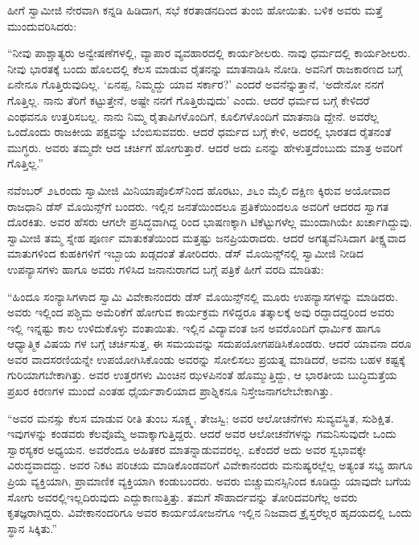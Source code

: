ಹೀಗೆ ಸ್ವಾಮೀಜಿ ನೇರವಾಗಿ ಕನ್ನಡಿ ಹಿಡಿದಾಗ, ಸಭೆ ಕರತಾಡನದಿಂದ ತುಂಬಿ ಹೋಯಿತು. ಬಳಿಕ ಅವರು ಮತ್ತೆ ಮುಂದುವರಿಸಿದರು:

“ನೀವು ಪಾಶ್ಚಾತ್ಯರು ಅನ್ವೇಷಣೆಗಳಲ್ಲಿ, ವ್ಯಾಪಾರ ವ್ಯವಹಾರದಲ್ಲಿ ಕಾರ್ಯಶೀಲರು. ನಾವು ಧರ್ಮದಲ್ಲಿ ಕಾರ್ಯಶೀಲರು. ನೀವು ಭಾರತಕ್ಕೆ ಬಂದು ಹೊಲದಲ್ಲಿ ಕೆಲಸ ಮಾಡುವ ರೈತನನ್ನು ಮಾತನಾಡಿಸಿ ನೋಡಿ. ಅವನಿಗೆ ರಾಜಕಾರಣದ ಬಗ್ಗೆ ಏನೇನೂ ಗೊತ್ತಿರುವುದಿಲ್ಲ. ‘ಏನಪ್ಪ, ನಿಮ್ಮದ್ದು ಯಾವ ಸರ್ಕಾರ?’ ಎಂದರೆ ಅವನೆನ್ನುತ್ತಾನೆ, ‘ಅದೇನೋ ನನಗೆ ಗೊತ್ತಿಲ್ಲ. ನಾನು ತೆರಿಗೆ ಕಟ್ಟುತ್ತೇನೆ, ಅಷ್ಟೇ ನನಗೆ ಗೊತ್ತಿರುವುದು’ ಎಂದು. ಆದರೆ ಧರ್ಮದ ಬಗ್ಗೆ ಕೇಳಿದರೆ ಎಂಥವನೂ ಉತ್ತರಿಸಬಲ್ಲ. ನಾನು ನಿಮ್ಮ ರೈತಾಪಿಗಳೊಂದಿಗೆ, ಕೂಲಿಗಳೊಂದಿಗೆ ಮಾತನಾಡಿ ದ್ದೇನೆ. ಅವರೆಲ್ಲ ಒಂದೊಂದು ರಾಜಕೀಯ ಪಕ್ಷವನ್ನು ಬೆಂಬಿಸುವವರು. ಆದರೆ ಧರ್ಮದ ಬಗ್ಗೆ ಕೇಳಿ, ಅದರಲ್ಲಿ ಭಾರತದ ರೈತನಂತೆ ಮುಗ್ಧರು. ಅವರು ತಮ್ಮದೇ ಆದ ಚರ್ಚಿಗೆ ಹೋಗುತ್ತಾರೆ. ಆದರೆ ಅದು ಏನನ್ನು ಹೇಳುತ್ತದೆಂಬುದು ಮಾತ್ರ ಅವರಿಗೆ ಗೊತ್ತಿಲ್ಲ.”

ನವೆಂಬರ್ ೨೬ರಂದು ಸ್ವಾಮೀಜಿ ಮಿನಿಯಾಪೊಲಿಸ್​ನಿಂದ ಹೊರಟು, ೨೬ಂ ಮೈಲಿ ದಕ್ಷಿಣ ಕ್ಕಿರುವ ಅಯೋವಾದ ರಾಜಧಾನಿ ಡೆಸ್ ಮೊಯಿನ್ಸ್​ಗೆ ಬಂದರು. ಇಲ್ಲಿನ ಜನತೆಯಿಂದಲೂ ಪ್ರತಿಕೆಯಿಂದಲೂ ಅವರಿಗೆ ಆದರದ ಸ್ವಾಗತ ದೊರಕಿತು. ಅವರ ಹೆಸರು ಆಗಲೇ ಪ್ರಸಿದ್ಧವಾಗಿದ್ದ ರಿಂದ ಭಾಷಣಕ್ಕಾಗಿ ಟಿಕೆಟ್ಟುಗಳೆಲ್ಲ ಮುಂದಾಗಿಯೇ ಖರ್ಚಾಗಿದ್ದುವು. ಸ್ವಾಮೀಜಿ ತಮ್ಮ ಸ್ನೇಹ ಪೂರ್ಣ ಮಾತುಕತೆಯಿಂದ ಮತ್ತಷ್ಟು ಜನಪ್ರಿಯರಾದರು. ಆದರೆ ಅಗತ್ಯವೆನಿಸಿದಾಗ ತೀಕ್ಷ್ಣವಾದ ಮಾತುಗಳಿಂದ ಕುಹಕಿಗಳಿಗೆ ಇಬ್ಬಾಯ ಖಡ್ಗದಂತೆ ತೋರಿದರು. ಡೆಸ್ ಮೊಯಿನ್ಸ್​ನಲ್ಲಿ ಸ್ವಾಮೀಜಿ ನೀಡಿದ ಉಪನ್ಯಾಸಗಳು ಹಾಗೂ ಅವರು ಗಳಿಸಿದ ಜನಾನುರಾಗದ ಬಗ್ಗೆ  ಪತ್ರಿಕೆ ಹೀಗೆ ವರದಿ ಮಾಡಿತು:

“ಹಿಂದೂ ಸಂನ್ಯಾಸಿಗಳಾದ ಸ್ವಾಮಿ ವಿವೇಕಾನಂದರು ಡೆಸ್ ಮೊಯಿನ್ಸ್​ನಲ್ಲಿ ಮೂರು ಉಪನ್ಯಾಸಗಳನ್ನು ಮಾಡಿದರು. ಅವರು ಇಲ್ಲಿಂದ ಪಶ್ಚಿಮ ಅಮೆರಿಕೆಗೆ ಹೋಗುವ ಕಾರ್ಯಕ್ರಮ ಗಳಿದ್ದರೂ ತತ್ಕಾಲಕ್ಕೆ ಅವು ರದ್ದಾದದ್ದರಿಂದ ಅವರು ಇಲ್ಲಿ ಇನ್ನಷ್ಟು ಕಾಲ ಉಳಿದುಕೊಳ್ಳು ವಂತಾಯಿತು. ಇಲ್ಲಿನ ವಿದ್ಯಾವಂತ ಜನ ಅವರೊಂದಿಗೆ ಧಾರ್ಮಿಕ ಹಾಗೂ ಆಧ್ಯಾತ್ಮಿಕ ವಿಷಯ ಗಳ ಬಗ್ಗೆ ಚರ್ಚಿಸುತ್ತ, ಈ ಸಮಯವನ್ನು ಸದುಪಯೋಗಪಡಿಸಿಕೊಂಡರು. ಆದರೆ ಯಾವನಾ ದರೂ ಅವರ ವಾದಸರಣಿಯನ್ನೇ ಉಪಯೋಗಿಸಿಕೊಂಡು ಅವರನ್ನು ಸೋಲಿಸಲು ಪ್ರಯತ್ನ ಮಾಡಿದರೆ, ಅವನು ಬಹಳ ಕಷ್ಟಕ್ಕೆ ಗುರಿಯಾಗಬೇಕಾಗಿತ್ತು. ಅವರ ಉತ್ತರಗಳು ಮಿಂಚಿನ ಝಳಪಿನಂತೆ ಹೊಮ್ಮುತ್ತಿದ್ದು, ಆ ಭಾರತೀಯ ಬುದ್ಧಿಮತ್ತೆಯ ಪ್ರಖರ ಕಿರಣಗಳ ಮುಂದೆ ಎಂತಹ ಧೈರ್ಯಶಾಲಿಯಾದ ಪ್ರಾಶ್ನಿಕನೂ ನಿಸ್ತೇಜನಾಗಲೇಬೇಕಾಗಿತ್ತು.

“ಅವರ ಮನಸ್ಸು ಕೆಲಸ ಮಾಡುವ ರೀತಿ ತುಂಬ ಸೂಕ್ಷ್ಮ, ತೇಜಸ್ವಿ; ಅವರ ಆಲೋಚನೆಗಳು ಸುವ್ಯವಸ್ಥಿತ, ಸುಶಿಕ್ಷಿತ. ಇವುಗಳನ್ನು ಕಂಡವರು ಕೆಲವೊಮ್ಮೆ ಅವಾಕ್ಕಾಗುತ್ತಿದ್ದರು. ಆದರೆ ಅವರ ಆಲೋಚನೆಗಳನ್ನು ಗಮನಿಸುವುದೇ ಒಂದು ಸ್ವಾರಸ್ಯಕರ ಅಧ್ಯಯನ. ಅವರೆಂದೂ ಅಹಿತಕರ ಮಾತನ್ನಾಡುವವರಲ್ಲ. ಏಕೆಂದರೆ ಅದು ಅವರ ಸ್ವಭಾವಕ್ಕೇ ವಿರುದ್ಧವಾದದ್ದು. ಅವರ ನಿಕಟ ಪರಿಚಯ ಮಾಡಿಕೊಂಡವರಿಗೆ ವಿವೇಕಾನಂದರು ಮನುಷ್ಯರಲ್ಲೆಲ್ಲ ಅತ್ಯಂತ ಸಭ್ಯ ಹಾಗೂ ಪ್ರಿಯ ವ್ಯಕ್ತಿಯಾಗಿ, ಪ್ರಾಮಾಣಿಕ ವ್ಯಕ್ತಿಯಾಗಿ ಕಂಡುಬಂದರು. ಅವರು ಬಿಚ್ಚುಮನಸ್ಸಿನಿಂದ ಕೂಡಿದ್ದು ಯಾವುದೇ ಬಗೆಯ ಸೋಗು ಅವರಲ್ಲಿಇಲ್ಲದಿರುವುದು ಎದ್ದುಕಾಣುತ್ತಿತ್ತು. ತಮಗೆ ಸೌಹಾರ್ದವನ್ನು ತೋರಿದವರಿಗೆಲ್ಲ ಅವರು ಕೃತಜ್ಞರಾಗಿದ್ದರು. ವಿವೇಕಾನಂದರಿಗೂ ಅವರ ಕಾರ್ಯಯೋಜನೆಗೂ ಇಲ್ಲಿನ ನಿಜವಾದ ಕ್ರೈಸ್ತರೆಲ್ಲರ ಹೃದಯದಲ್ಲಿ ಒಂದು ಸ್ಥಾನ ಸಿಕ್ಕಿತು.”

